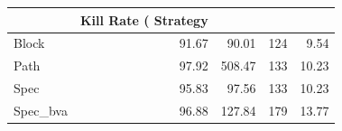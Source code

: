 \begin{tabular}{lrrrr}
\toprule
 & Kill Rate (%
Strategy &  &  &  &  \\
\midrule
Block & 91.67 & 90.01 & 124 & 9.54 \\
Path & 97.92 & 508.47 & 133 & 10.23 \\
Spec & 95.83 & 97.56 & 133 & 10.23 \\
Spec_bva & 96.88 & 127.84 & 179 & 13.77 \\
\bottomrule
\end{tabular}
